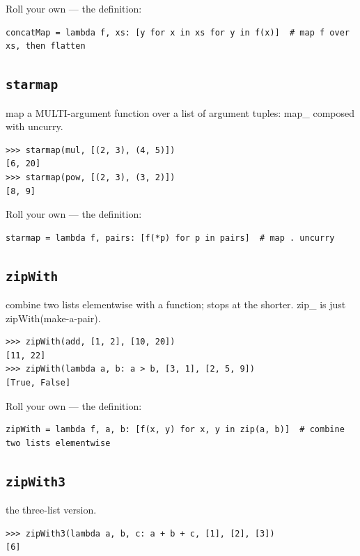 \documentclass[10pt,letterpaper]{book}
\begin{document}
Roll your own --- the definition:

\begin{lstlisting}[style=ex]
concatMap = lambda f, xs: [y for x in xs for y in f(x)]  # map f over xs, then flatten
\end{lstlisting}
\subsection{\texttt{starmap}}\label{def:starmap}
map a MULTI-argument function over a list of argument tuples: map\_ composed with uncurry.
\begin{lstlisting}[style=ex]
>>> starmap(mul, [(2, 3), (4, 5)])
[6, 20]
>>> starmap(pow, [(2, 3), (3, 2)])
[8, 9]
\end{lstlisting}

Roll your own --- the definition:

\begin{lstlisting}[style=ex]
starmap = lambda f, pairs: [f(*p) for p in pairs]  # map . uncurry
\end{lstlisting}

\subsection{\texttt{zipWith}}\label{def:zipWith}
combine two lists elementwise with a function; stops at the shorter. zip\_ is just zipWith(make-a-pair).
\begin{lstlisting}[style=ex]
>>> zipWith(add, [1, 2], [10, 20])
[11, 22]
>>> zipWith(lambda a, b: a > b, [3, 1], [2, 5, 9])
[True, False]
\end{lstlisting}

Roll your own --- the definition:

\begin{lstlisting}[style=ex]
zipWith = lambda f, a, b: [f(x, y) for x, y in zip(a, b)]  # combine two lists elementwise
\end{lstlisting}
\subsection{\texttt{zipWith3}}\label{def:zipWith3}
the three-list version.
\begin{lstlisting}[style=ex]
>>> zipWith3(lambda a, b, c: a + b + c, [1], [2], [3])
[6]
\end{lstlisting}
\end{document}

